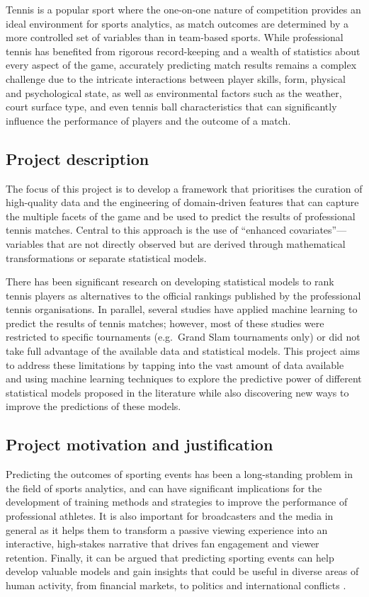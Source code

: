 Tennis is a popular sport where the one-on-one nature of competition provides an ideal environment
for sports analytics, as match outcomes are determined by a more controlled set of variables than in
team-based sports. While professional tennis has benefited from rigorous record-keeping and a wealth
of statistics about every aspect of the game, accurately predicting match results remains a complex
challenge due to the intricate interactions between player skills, form, physical and psychological
state, as well as environmental factors such as the weather, court surface type, and even tennis ball
characteristics that can significantly influence the performance of players and the outcome of a
match.


\subsection{Project description}

The focus of this project is to develop a framework that prioritises the curation of high-quality
data and the engineering of domain-driven features that can capture the multiple facets of the game
and be used to predict the results of professional tennis matches. Central to this approach is the
use of ``enhanced covariates''---variables that are not directly observed but are derived through
mathematical transformations or separate statistical models.

There has been significant research on developing statistical models to rank tennis players as
alternatives to the official rankings published by the professional tennis organisations. In
parallel, several studies have applied machine learning to predict the results of tennis matches;
however, most of these studies were restricted to specific tournaments (e.g.\ Grand Slam tournaments
only) or did not take full advantage of the available data and statistical models. This project aims
to address these limitations by tapping into the vast amount of data available and using machine
learning techniques to explore the predictive power of different statistical models proposed in the
literature while also discovering new ways to improve the predictions of these models.


\subsection{Project motivation and justification}

Predicting the outcomes of sporting events has been a long-standing problem in the field of sports
analytics, and can have significant implications for the development of training methods and
strategies to improve the performance of professional athletes. It
is also important for broadcasters and the media in general as it helps them to transform a passive
viewing experience into an interactive, high-stakes narrative that drives fan engagement and viewer
retention. Finally, it can be argued that predicting sporting events can help develop valuable
models and gain insights that could be useful in diverse areas of human activity, from financial
markets, to politics and international conflicts \parencite{gu_2019}.


